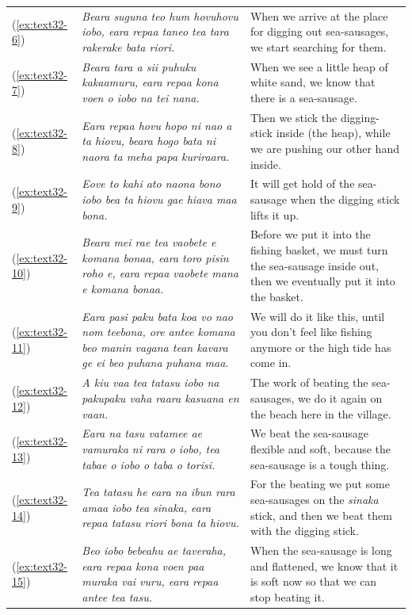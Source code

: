 \documentclass[output=paper]{langscibook}
\begin{document}
\begin{xltabular}{\textwidth}{lXX}
	(\ref{ex:text32-6})&\textit{Beara suguna teo hum hovuhovu iobo, eara repaa taneo tea tara rakerake bata riori.}&When we arrive at the place for digging out sea-sausages, we start searching for them.\\
	(\ref{ex:text32-7})&\textit{Beara tara a sii puhuku kakaamuru, eara repaa kona voen o iobo na tei nana.}&When we see a little heap of white sand, we know that there is a sea-sausage.\\
	(\ref{ex:text32-8})&\textit{Eara repaa hovu hopo ni nao a ta hiovu, beara hogo bata ni naora ta meha papa kuriraara.}&Then we stick the digging-stick inside (the heap), while we are pushing our other hand inside.\\
	(\ref{ex:text32-9})&\textit{Eove to kahi ato naona bono iobo bea ta hiovu gae hiava maa bona.}&It will get hold of the sea-sausage when the digging stick lifts it up.\\
	(\ref{ex:text32-10})&\textit{Beara mei rae tea vaobete e komana bonaa, eara toro pisin roho e, eara repaa vaobete mana e komana bonaa.}&Before we put it into the fishing basket, we must turn the sea-sausage inside out, then we eventually put it into the basket.\\
	(\ref{ex:text32-11})&\textit{Eara pasi paku bata koa vo nao nom teebona, ore antee komana beo manin vagana tean kavara ge ei beo puhana puhana maa.}&We will do it like this, until you don't feel like fishing anymore or the high tide has come in.\\
    (\ref{ex:text32-12})&\textit{A kiu vaa tea tatasu iobo na pakupaku vaha raara kasuana en vaan.}&The work of beating the sea-sausages, we do it again on the beach here in the village.\\
	(\ref{ex:text32-13})&\textit{Eara na tasu vatamee ae vamuraka ni rara o iobo, tea tabae o iobo o taba o torisi.}&We beat the sea-sausage flexible and soft, because the sea-sausage is a tough thing.\\
	(\ref{ex:text32-14})&\textit{Tea tatasu he eara na ibun rara amaa iobo tea sinaka, eara repaa tatasu riori bona ta hiovu.}&For the beating we put some sea-sausages on the \textit{sinaka} stick, and then we beat them with the digging stick.\\
	(\ref{ex:text32-15})&\textit{Beo iobo bebeahu ae taveraha, eara repaa kona voen paa muraka vai vuru, eara repaa antee tea tasu.}&When the sea-sausage is long and flattened, we know that it is soft now so that we can stop beating it.\\
\end{xltabular}
\end{document}
